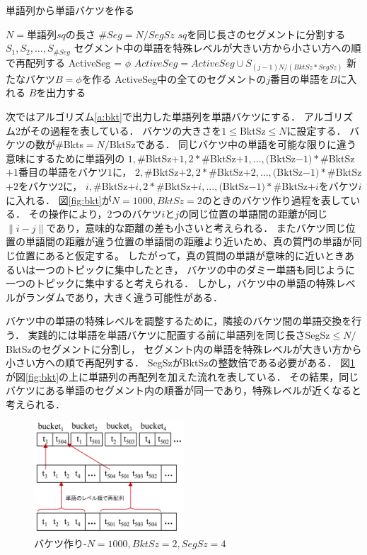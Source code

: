 \documentclass[master]{suribt}
\theoremstyle{definition}
\begin{document}
 \begin{algorithm}
 \caption{単語列から単語バケツを作る}
 \begin{algorithmic}[1]
  \State $N=$単語列$sq$の長さ
  \State $\#Seg=N/SegSz$
  \State $sq$を同じ長さのセグメントに分割する$S_1,S_2, \dots , S_{\#Seg}$
  \State セグメント中の単語を特殊レベルが大きい方から小さい方への順で再配列する
   \State ActiveSeg = $\phi$
    \State $ActiveSeg = ActiveSeg \cup S_{(j-1)N/(BktSz * SegSz)}$
   \EndFor
    \State 新たなバケツ$B=\phi$を作る
    \State ActiveSeg中の全てのセグメントの$j$番目の単語を$B$に入れる
    \State $B$を出力する
   \EndFor
  \EndFor
 \EndFunction
 \end{algorithmic}
 \label{a:bkt2}
 \end{algorithm}
 
 次ではアルゴリズム\ref{a:bkt}で出力した単語列を単語バケツにする．
 アルゴリズム2がその過程を表している．
 バケツの大きさを$1 \leq$BktSz$\leq N$に設定する．
 バケツの数が\#Bkts$=N/$BktSzである．
 同じバケツ中の単語を可能な限りに違う意味にするために単語列の
 $1,\#$BktSz$+1,2*\#$BktSz$+1, \dots,($BktSz$-1)*\#$BktSz$+1$番目の単語をバケツ$1$に，
 $2,\#$BktSz$+2,2*\#$BktSz$+2, \dots,($BktSz$-1)*\#$BktSz$+2$をバケツ$2$に，
 $i,\#$BktSz$+i,2*\#$BktSz$+i, \dots,($BktSz$-1)*\#$BktSz$+i$をバケツ$i$に入れる．
 図\ref{fig:bkt}が$N=1000,BktSz=2$のときのバケツ作り過程を表している．
 その操作により，2つのバケツ$i$と$j$の同じ位置の単語間の距離が同じ$\|i-j\|$であり，意味的な距離の差も小さいと考えられる．
 またバケツ同じ位置の単語間の距離が違う位置の単語間の距離より近いため、真の質門の単語が同じ位置にあると仮定する。
 したがって，真の質問の単語が意味的に近いときあるいは一つのトピックに集中したとき，
 バケツの中のダミー単語も同じように一つのトピックに集中すると考えられる．
 しかし，バケツ中の単語の特殊レベルがランダムであり，大きく違う可能性がある．

 バケツ中の単語の特殊レベルを調整するために，隣接のバケツ間の単語交換を行う．
 実践的には単語を単語バケツに配置する前に単語列を同じ長さSegSz$\leq N/$BktSzのセグメントに分割し，
 セグメント内の単語を特殊レベルが大きい方から小さい方への順で再配列する．
 SegSzがBktSzの整数倍である必要がある．
 図\ref{fig:bkt2}が図\ref{fig:bkt}の上に単語列の再配列を加えた流れを表している．
 その結果，同じバケツにある単語のセグメント内の順番が同一であり，特殊レベルが近くなると考えられる．

 \begin{figure}
  \centering
  \includegraphics[width=0.5\textwidth,height=0.3\textwidth,natwidth=1600,natheight=1196]{rk13.png}
  \caption{バケツ作り-$N=1000,BktSz=2,SegSz=4$}\label{fig:bkt2}
 \end{figure}
\end{document}
